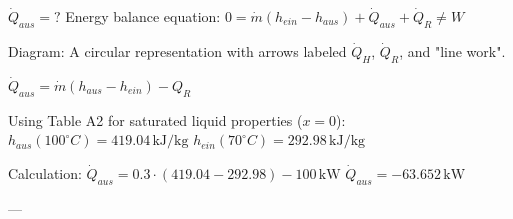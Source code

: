 \( \dot{Q}_{aus} = ? \)  
Energy balance equation:  
\( 0 = \dot{m} (h_{ein} - h_{aus}) + \dot{Q}_{aus} + \dot{Q}_R \neq W \)  

Diagram: A circular representation with arrows labeled \( \dot{Q}_H \), \( \dot{Q}_R \), and "line work".  

\( \dot{Q}_{aus} = \dot{m} (h_{aus} - h_{ein}) - Q_R \)  

Using Table A2 for saturated liquid properties (\( x = 0 \)):  
\( h_{aus} (100^\circ C) = 419.04 \, \text{kJ/kg} \)  
\( h_{ein} (70^\circ C) = 292.98 \, \text{kJ/kg} \)  

Calculation:  
\( \dot{Q}_{aus} = 0.3 \cdot (419.04 - 292.98) - 100 \, \text{kW} \)  
\( \dot{Q}_{aus} = -63.652 \, \text{kW} \)  

---
